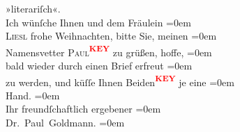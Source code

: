 \begin{ledgroupsized}[t]{13cm}
               »literariſch«. {\\[\baselineskip]}Ich wünſche Ihnen und dem Fräulein\pend
           \leftskip=0em{}\pstart
           {\\[\baselineskip]}\textsc{Liesl} frohe Weihnachten, bitte Sie, meinen\pend
           \leftskip=0em{}\pstart
           {\\[\baselineskip]}Namensvetter \textsc{Paul\textcolor{red}{\textsuperscript{\textbf{KEY}}}} zu grüßen, hoffe,\pend
           \leftskip=0em{}\pstart
           {\\[\baselineskip]}bald wieder durch einen Brief erfreut\pend
           \leftskip=0em{}\pstart
           {\\[\baselineskip]}zu werden, und küſſe Ihnen Beiden\textcolor{red}{\textsuperscript{\textbf{KEY}}} je eine\pend
           \leftskip=0em{}\pstart
           {\\[\baselineskip]}Hand.\pend
           \leftskip=0em{}\pstart
           {\\[\baselineskip]}Ihr freundſchaftlich ergebener\pend
           \leftskip=0em{}\pstart
           {\\[\baselineskip]}\spacefill\mbox{Dr. Paul Goldmann.}\pend
           \leftskip=0em{}
         
         \endnumbering{}\end{ledgroupsized}\begin{anhang}\end{anhang}\newcommand{\dateiname}{L03537}\newcommand{\titel}{Paul Goldmann an Olga XXXX Gussmann/Schnitzler, 20. 12. [XXXX]}\newcommand{\editorInnen}{Martin Anton Müller und Laura Untner}
      